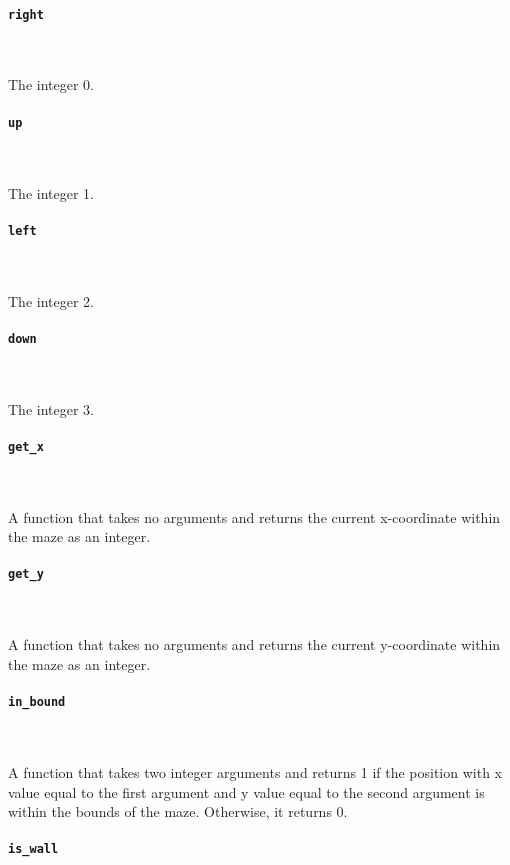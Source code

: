 \paragraph{\texttt{right}} \

The integer 0.

\paragraph{\texttt{up}} \

The integer 1.

\paragraph{\texttt{left}} \

The integer 2.

\paragraph{\texttt{down}} \

The integer 3.

\paragraph{\texttt{get\_x}} \

A function that takes no arguments and returns the current x-coordinate within the maze as an integer.

\paragraph{\texttt{get\_y}} \

A function that takes no arguments and returns the current y-coordinate within the maze as an integer.

\paragraph{\texttt{in\_bound}} \

A function that takes two integer arguments and returns 1 if the position with x value equal to the first argument and y value equal to the second argument is within the bounds of the maze. Otherwise, it returns 0.

\paragraph{\texttt{is\_wall}} \

